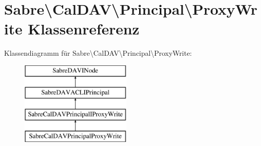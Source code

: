 \hypertarget{class_sabre_1_1_cal_d_a_v_1_1_principal_1_1_proxy_write}{}\section{Sabre\textbackslash{}Cal\+D\+AV\textbackslash{}Principal\textbackslash{}Proxy\+Write Klassenreferenz}
\label{class_sabre_1_1_cal_d_a_v_1_1_principal_1_1_proxy_write}
Klassendiagramm für Sabre\textbackslash{}Cal\+D\+AV\textbackslash{}Principal\textbackslash{}Proxy\+Write\+:\begin{figure}[H]
\begin{center}
\leavevmode
\includegraphics[height=4.000000cm]{class_sabre_1_1_cal_d_a_v_1_1_principal_1_1_proxy_write}
\end{center}
\end{figure}

